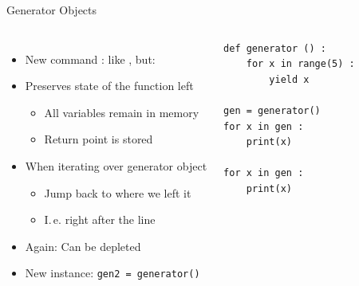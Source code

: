 \begin{frame}[fragile]{Generator Objects}
%
\begin{columns}[T]
\begin{itemize}
\item New command : like , but:
\item Preserves state of the function left
	\begin{itemize}
	\item All variables remain in memory
	\item Return point is stored
	\end{itemize}
\item When iterating over generator object
	\begin{itemize}
	\item Jump back to where we left it
	\item I.\,e. right after the  line
	\end{itemize}
\item Again: Can be depleted
\item New instance: \texttt{gen2 = generator()}
\end{itemize}
%
\begin{codebox}
\begin{verbatim}
def generator () :
    for x in range(5) :
        yield x

gen = generator()
for x in gen :
    print(x)

for x in gen :
    print(x)
\end{verbatim}
\end{codebox}
\end{columns}
%
\end{frame}


